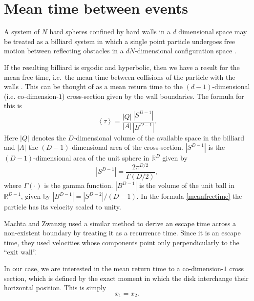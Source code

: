 \documentclass[a4paper,10pt, jcp, aps, preprint]{revtex4-1}
\newcommand{\mean}[1]{\left \langle #1 \right \rangle}
\newcommand{\RR}{\mathbb{R}}
\begin{document}
 

\section{Mean time between events}

A system of $N$ hard spheres confined by hard walls in a $d$ dimensional
space may be treated as a billiard system 
in which a single point  particle undergoes free motion between reflecting obstacles 
in a $ d N $-dimensional configuration space \cite{Sinai70, MarkChern}. 

If the resulting billiard is ergodic and hyperbolic, then we
have a result for the mean free time, i.e.\ the mean time between 
collisions of the particle with the walls \cite{MarkChern}. 
This can be thought of as a mean return time to the $(d-1)$-dimensional 
(i.e. co-dimension-$1$) cross-section given by the wall boundaries.
The formula for this is
\begin{equation}\label{meanfreetime}
 \mean{\tau} = \frac{|Q|}{|A|} \frac{|S^{D-1}|}{|B^{D-1}|}.
\end{equation}
Here $|Q|$ denotes the $D$-dimensional volume of the available 
space in the billiard and 
$|A|$ the $(D-1)$-dimensional area of the cross-section.
 $|S^{D-1}|$ is the $(D-1)$-dimensional area of the unit sphere in $\RR^D$ given by
\begin{equation}
  |S^{D-1}| = \frac{2 \pi^{D/2}}{\Gamma(D/2)},
\end{equation}
where $\Gamma(\cdot)$ is the gamma function. 
$|B^{D-1}|$ is the volume of the unit ball 
in $\RR^{D-1}$, given by $|B^{D-1}| = |S^{D-2}| / (D-1)$.
In the formula \ref{meanfreetime}  the particle has 
its velocity scaled to unity.

Machta and Zwanzig \cite{MachtaZwan} used a similar method to derive an escape 
time across a non-existent boundary by treating it as a recurrence time.
Since it is an escape time, they used velocities whose components point only 
perpendicularly to the ``exit wall''.

In our case, we are interested in the mean return time to 
a co-dimension-$1$ cross section, 
which is defined by the exact moment
in which the disk interchange their horizontal position. This is simply
\begin{equation} \label{condchoque}
x_1 = x_2.
\end{equation}
\end{document}

